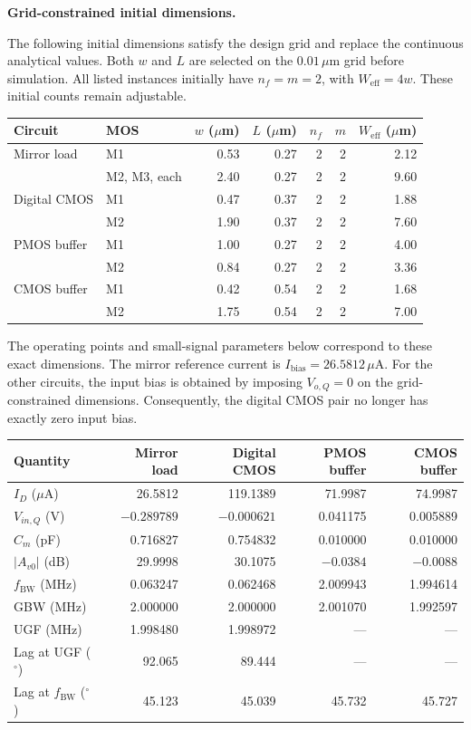 \documentclass[12pt,letterpaper]{article}
\newcommand{\um}{\,\mu\mathrm{m}}
\newcommand{\uA}{\,\mu\mathrm{A}}
\begin{document}
\begin{enumerate}
\newpage
\textbf{Grid-constrained initial dimensions.}

The following initial dimensions satisfy the design grid and replace
the continuous analytical values. Both $w$ and $L$ are selected
on the $0.01\um$ grid before simulation.
All listed instances initially have $n_f=m=2$, with
$W_{\mathrm{eff}}=4w$. These initial counts remain adjustable.
\begin{center}
\small
\setlength{\tabcolsep}{5pt}
\begin{tabular}{@{}llrrrrr@{}}
\toprule
Circuit & MOS & $w$ ($\mu$m) & $L$ ($\mu$m) & $n_f$ & $m$
& $W_{\mathrm{eff}}$ ($\mu$m)\\
\midrule
Mirror load & M1 & 0.53 & 0.27 & 2 & 2 & 2.12\\
 & M2, M3, each & 2.40 & 0.27 & 2 & 2 & 9.60\\
Digital CMOS & M1 & 0.47 & 0.37 & 2 & 2 & 1.88\\
 & M2 & 1.90 & 0.37 & 2 & 2 & 7.60\\
PMOS buffer & M1 & 1.00 & 0.27 & 2 & 2 & 4.00\\
 & M2 & 0.84 & 0.27 & 2 & 2 & 3.36\\
CMOS buffer & M1 & 0.42 & 0.54 & 2 & 2 & 1.68\\
 & M2 & 1.75 & 0.54 & 2 & 2 & 7.00\\
\bottomrule
\end{tabular}
\end{center}

The operating points and small-signal parameters below correspond
to these exact dimensions. The mirror reference current is
$I_{\mathrm{bias}}=26.5812\uA$. For the other circuits, the input
bias is obtained by imposing $V_{o,Q}=0$ on the grid-constrained
dimensions. Consequently, the digital CMOS
pair no longer has exactly zero input bias.

\begin{center}
\small
\setlength{\tabcolsep}{4pt}
\begin{tabular}{@{}lrrrr@{}}
\toprule
Quantity & Mirror load & Digital CMOS & PMOS buffer & CMOS buffer\\
\midrule
$I_D$ ($\mu$A) & 26.5812 & 119.1389 & 71.9987 & 74.9987\\
$V_{in,Q}$ (V) & $-0.289789$ & $-0.000621$ & 0.041175 & 0.005889\\
$C_m$ (pF) & 0.716827 & 0.754832 & 0.010000 & 0.010000\\
$|A_{v0}|$ (dB) & 29.9998 & 30.1075 & $-0.0384$ & $-0.0088$\\
$f_{\mathrm{BW}}$ (MHz) & 0.063247 & 0.062468 & 2.009943 & 1.994614\\
GBW (MHz) & 2.000000 & 2.000000 & 2.001070 & 1.992597\\
UGF (MHz) & 1.998480 & 1.998972 & --- & ---\\
Lag at UGF ($^\circ$) & 92.065 & 89.444 & --- & ---\\
Lag at $f_{\mathrm{BW}}$ ($^\circ$) & 45.123 & 45.039 & 45.732 & 45.727\\
\bottomrule
\end{tabular}
\end{center}


\end{enumerate}
\end{document}

